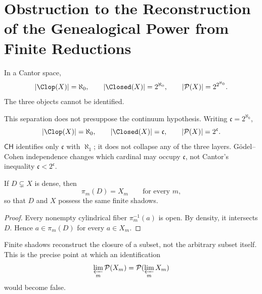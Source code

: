 \section{Obstruction to the Reconstruction of the Genealogical Power from Finite Reductions}

In a Cantor space,
\[
 |\Clop(X)|=\aleph_0,
 \qquad
 |\Closed(X)|=2^{\aleph_0},
 \qquad
 |\mathcal P(X)|=2^{2^{\aleph_0}}.
\]
The three objects cannot be identified.

This separation does not presuppose the continuum hypothesis. Writing
\(\mathfrak c=2^{\aleph_0}\),
\[
 |\Clop(X)|=\aleph_0,\qquad
 |\Closed(X)|=\mathfrak c,\qquad
 |\mathcal P(X)|=2^{\mathfrak c}.
\]
\(\mathsf{CH}\) identifies only \(\mathfrak c\) with \(\aleph_1\); it does not
collapse any of the three layers. Gödel--Cohen independence changes which
cardinal may occupy \(\mathfrak c\), not Cantor's inequality
\(\mathfrak c<2^{\mathfrak c}\).

\begin{proposition}
If \(D\subsetneq X\) is dense, then
\[
  \pi_m(D)=X_m
  \qquad\text{for every }m,
\]
so that \(D\) and \(X\) possess the same finite shadows.
\end{proposition}

\begin{proof}
Every nonempty cylindrical fiber \(\pi_m^{-1}(a)\) is open. By density, it
intersects \(D\). Hence \(a\in\pi_m(D)\) for every
\(a\in X_m\).
\end{proof}

Finite shadows reconstruct the closure of a subset, not the
arbitrary subset itself. This is the precise point at which an identification
\[
  \varprojlim_m\mathcal P(X_m)
  =
  \mathcal P(\varprojlim_mX_m)
\]
would become false.

